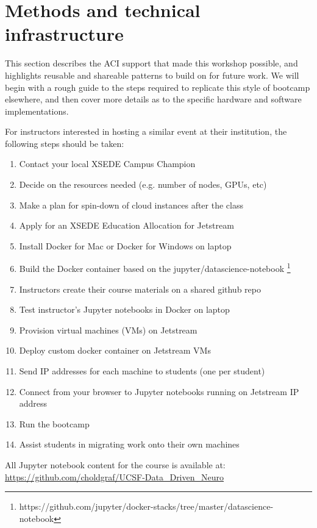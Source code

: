 \section{Methods and technical infrastructure}\label{sec:methods}

This section describes the ACI support that made this workshop possible, and
highlights reusable and shareable patterns to build on for future work. We will
begin with a rough guide to the steps required to replicate this style of
bootcamp elsewhere, and then cover more details as to the specific hardware and
software implementations.

For instructors interested in hosting a similar event at their institution, the
following steps should be taken:

\begin{enumerate}
\item Contact your local XSEDE Campus Champion
\item Decide on the resources needed (e.g. number of nodes, GPUs, etc)
\item Make a plan for spin-down of cloud instances after the class
\item Apply for an XSEDE Education Allocation for Jetstream
\item Install Docker for Mac or Docker for Windows on laptop
\item Build the Docker container based on the jupyter/datascience-notebook \footnote{https://github.com/jupyter/docker-stacks/tree/master/datascience-notebook}
\item Instructors create their course materials on a shared github repo
\item Test instructor's Jupyter notebooks in Docker on laptop
\item Provision virtual machines (VMs) on Jetstream
\item Deploy custom docker container on Jetstream VMs
\item Send IP addresses for each machine to students (one per student)
\item Connect from your browser to Jupyter notebooks running on Jetstream IP address
\item Run the bootcamp
\item Assist students in migrating work onto their own machines
\end{enumerate}

All Jupyter notebook content for the course is available at:
\url{https://github.com/choldgraf/UCSF-Data_Driven_Neuro}


